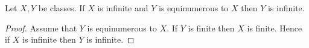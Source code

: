 \documentclass[10pt]{article}
\begin{document}
  \begin{forthel}
    \begin{proposition}
      Let $X, Y$ be classes.
      If $X$ is infinite and $Y$ is equinumerous to $X$ then $Y$ is infinite.
    \end{proposition}
    \begin{proof}
      Assume that $Y$ is equinumerous to $X$.
      If $Y$ is finite then $X$ is finite.
      Hence if $X$ is infinite then $Y$ is infinite.
    \end{proof}
  \end{forthel}
\end{document}
